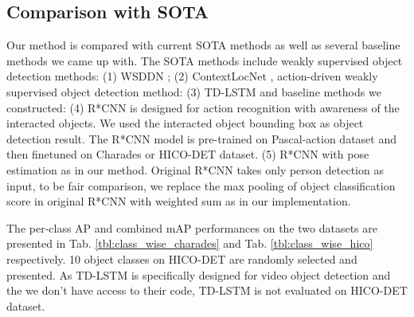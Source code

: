 \subsection{Comparison with SOTA}
Our method is compared with current SOTA methods as well as several baseline methods we came up with. The SOTA methods include weakly supervised object detection methods: (1) WSDDN \cite{bilen2016weakly}; (2) ContextLocNet \cite{kantorov2016contextlocnet}, action-driven weakly supervised object detection method: (3) TD-LSTM \cite{yuan2017temporal} and baseline methods we constructed: (4) R*CNN \cite{gkioxari2015contextual} is designed for action recognition with awareness of the interacted objects. We used the interacted object bounding box as object detection result. The R*CNN model is pre-trained on Pascal-action dataset and then finetuned on Charades or HICO-DET dataset. (5) R*CNN with pose estimation as in our method. Original R*CNN takes only person detection as input, to be fair comparison, we replace the max pooling of object classification score in original R*CNN with weighted sum as in our implementation. 

The per-class AP and combined mAP performances on the two datasets are presented in Tab. \ref{tbl:class_wise_charades} and Tab. \ref{tbl:class_wise_hico} respectively. 10 object classes on HICO-DET are randomly selected and presented. As TD-LSTM \cite{yuan2017temporal} is specifically designed for video object detection and the we don't have access to their code, TD-LSTM is not evaluated on HICO-DET dataset.





